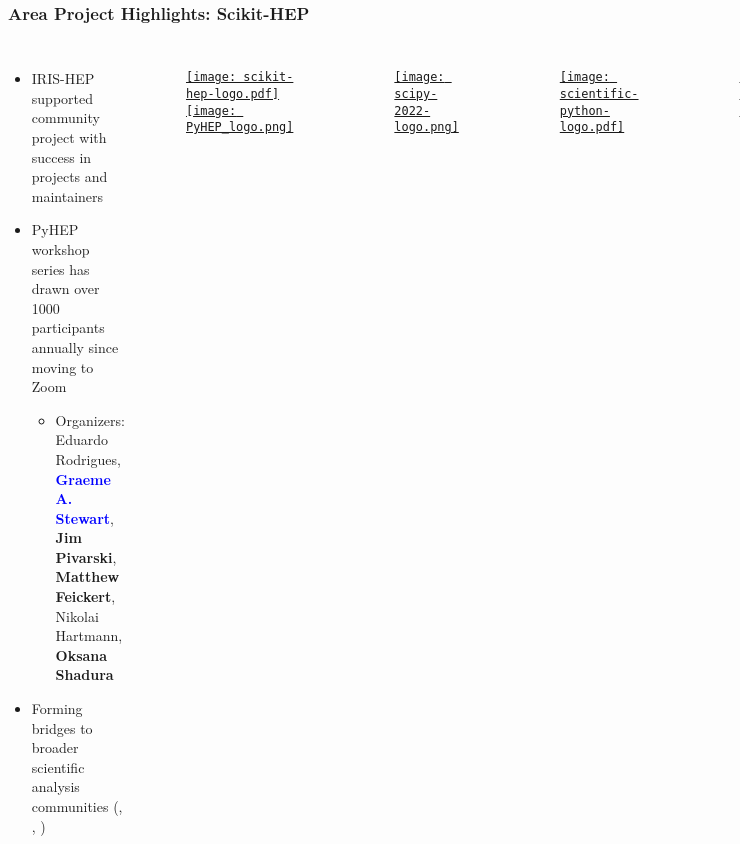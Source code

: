 \begin{frame}
  \frametitle{Area Project Highlights: Scikit-HEP}

  \begin{columns}
    \begin{itemize}
      \item IRIS-HEP supported community project with success in projects and maintainers
      \item PyHEP workshop series has drawn over 1000 participants annually since moving to Zoom
      \begin{itemize}
        \item {\small {} Organizers: Eduardo Rodrigues, \textcolor{blue}{\textbf{Graeme A. Stewart}}, \textbf{Jim Pivarski}, \textbf{Matthew Feickert}, Nikolai Hartmann, \textbf{Oksana Shadura}}
      \end{itemize}
      \item Forming bridges to broader scientific analysis communities (, , )
    \end{itemize}
%
    \begin{figure}
        \begin{center}
            \href{https://scikit-hep.org/}{\texttt{[image: scikit-hep-logo.pdf]}}
            \href{https://indico.cern.ch/event/1150631/}{\texttt{[image: PyHEP\_logo.png]}}
        \end{center}
    \end{figure}
    \begin{figure}
        \begin{center}
            \href{https://www.scipy2022.scipy.org/}{\texttt{[image: scipy-2022-logo.png]}}
        \end{center}
    \end{figure}
    \begin{figure}
        \begin{center}
            \href{https://scientific-python.org/}{\texttt{[image: scientific-python-logo.pdf]}}
        \end{center}
    \end{figure}
    \begin{figure}
        \begin{center}
            \href{https://numfocus.org/}{\texttt{[image: NumFOCUS-logo.pdf]}}
        \end{center}
    \end{figure}
  \end{columns}
\end{frame}

